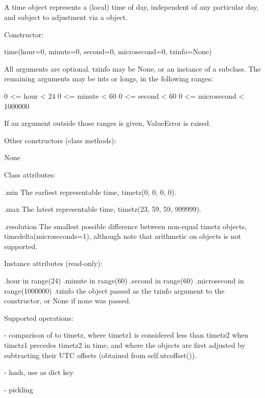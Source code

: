 {\subsection{ \label{datetime-timetz}}

A time object represents a (local) time of day, independent of any
particular day, and subject to adjustment via a  object.

Constructor:

    time(hour=0, minute=0, second=0, microsecond=0, tzinfo=None)

    All arguments are optional.  tzinfo may be None, or an instance of
    a  subclass.  The remaining arguments may be ints or longs, in
    the following ranges:

        0 <= hour < 24
        0 <= minute < 60
        0 <= second < 60
        0 <= microsecond < 1000000

    If an argument outside those ranges is given, ValueError is raised.

Other constructors (class methods):

    None

Class attributes:

    .min
        The earliest representable time, timetz(0, 0, 0, 0).

    .max
        The latest representable time, timetz(23, 59, 59, 999999).

    .resolution
        The smallest possible difference between non-equal timetz
        objects, timedelta(microseconds=1), although note that
        arithmetic on  objects is not supported.

Instance attributes (read-only):

    .hour           in range(24)
    .minute         in range(60)
    .second         in range(60)
    .microsecond    in range(1000000)
    .tzinfo         the object passed as the tzinfo argument to the
                     constructor, or None if none was passed.

Supported operations:

    - comparison of  to timetz, where timetz1 is considered
      less than timetz2 when timetz1 precedes timetz2 in time, and
      where the  objects are first adjusted by subtracting
      their UTC offsets (obtained from self.utcoffset()).

    - hash, use as dict key

    - pickling

}
